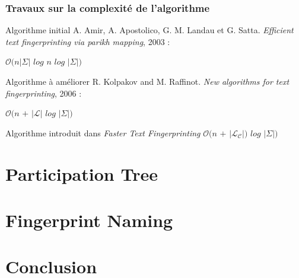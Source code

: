 \documentclass[10pt]{beamer}
\begin{document}
\begin{frame}
	\frametitle{Travaux sur la complexité de l'algorithme}
	
	\begin{block}{Algorithme initial}
		A. Amir, A. Apostolico, G. M. Landau et G. Satta. \textit{Efficient text fingerprinting via parikh mapping}, 2003 :\newline
		
		$\mathcal{O}(n|\Sigma|$ $log$ $n$ $log$ $|\Sigma|)$
	\end{block}
	
	\begin{block}{Algorithme à améliorer}
		R. Kolpakov and M. Raffinot. \textit{New algorithms for text fingerprinting}, 2006 : \newline
		
		$\mathcal{O}(n$ $+$ $|\mathcal{L}|$ $log$ $|\Sigma|)$
	\end{block}
	
	\begin{block}{Algorithme introduit dans \textit{Faster Text Fingerprinting}}
		$\mathcal{O}(n$ $+$ $|\mathcal{L}_{\mathcal{C}}|)$ $log$ $|\Sigma|)$
	\end{block}

\end{frame}


\section{Participation Tree}

\section{Fingerprint Naming}

\section{Conclusion}
\end{document}
